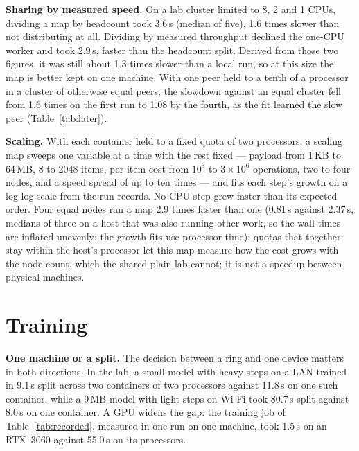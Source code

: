 \textbf{Sharing by measured speed.} On a lab cluster limited to 8, 2 and
1 CPUs, dividing a map by headcount took 3.6\,s (median of five), 1.6 times slower
than not distributing at all. Dividing by measured throughput declined the
one-CPU worker and took 2.9\,s, faster than the headcount split. Derived from
those two figures, it was still about 1.3 times slower than a local run, so at
this size the map is better kept on one machine.
With one peer held to a tenth of a processor in a cluster of otherwise equal
peers, the slowdown against an equal cluster fell from 1.6 times on the first
run to 1.08 by the fourth, as the fit learned the slow peer
(Table~\ref{tab:later}).

\textbf{Scaling.} With each container held to a fixed quota of two processors,
a scaling map sweeps one variable at a time with the rest
fixed --- payload from 1\,KB to 64\,MB, 8 to 2048 items, per-item cost from
$10^3$ to $3\times10^6$ operations, two to four nodes, and a speed spread of up to
ten times --- and fits each step's growth on a log-log scale from the run
records. No CPU step grew faster than its expected order. Four equal nodes ran a
map 2.9 times faster than one (0.81\,s against 2.37\,s, medians of three on a
host that was also running other work, so the wall times are inflated
unevenly; the growth fits use processor time): quotas that together
stay within the host's processor let this map measure how the cost grows with
the node count, which the shared plain lab cannot; it is not a speedup between
physical machines.

\section{Training}
\label{sec:res-train}

\textbf{One machine or a split.} The decision between a ring and one device
matters in both directions. In the lab, a small model with heavy steps on a LAN
trained in 9.1\,s split across two containers of two processors against
11.8\,s on one such container, while a 9\,MB model with light steps on Wi-Fi
took 80.7\,s split against 8.0\,s on one container. A GPU widens the gap: the
training job of Table~\ref{tab:recorded}, measured in one run on one machine,
took 1.5\,s on an RTX~3060 against 55.0\,s on its processors.


